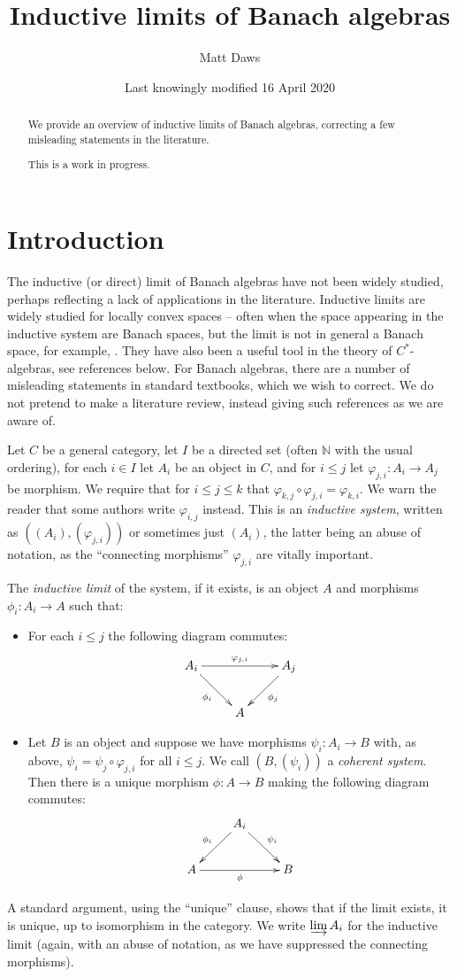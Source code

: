 \documentclass[a4paper,11pt]{article}
\title{Inductive limits of Banach algebras}
\author{Matt Daws}
\date{Last knowingly modified 16 April 2020}
\newcommand{\indlim}{\varinjlim}
\theoremstyle{definition}
\begin{document}
\maketitle

\begin{abstract}
We provide an overview of inductive limits of Banach algebras, correcting a few misleading
statements in the literature.

This is a work in progress.
\end{abstract}

\section{Introduction}

The inductive (or direct) limit of Banach algebras have not been widely studied, perhaps reflecting
a lack of applications in the literature.  Inductive limits are widely studied for locally convex
spaces -- often when the space appearing in the inductive system are Banach spaces, but the limit is
not in general a Banach space, for example, \cite[Chapter~IV, Section~5]{conway}.  They have also
been a useful tool in the theory of $C^*$-algebras, see references below.  For Banach algebras,
there are a number of misleading statements in standard textbooks, which we wish to correct.  We do
not pretend to make a literature review, instead giving such references as we are aware of.

Let $C$ be a general category, let $I$ be a directed set (often $\mathbb N$ with the usual
ordering), for each $i\in I$ let $A_i$ be an object in $C$, and for $i\leq j$ let $\varphi_{j,i}:
A_i\rightarrow A_j$ be morphism.  We require that for $i\leq j\leq k$ that $\varphi_{k,j} \circ
\varphi_{j,i} = \varphi_{k,i}$.  We warn the reader that some authors write $\varphi_{i,j}$
instead.  This is an \emph{inductive system}, written as $((A_i), (\varphi_{j,i}))$ or sometimes
just $(A_i)$, the latter being an abuse of notation, as the ``connecting morphisms'' $\varphi_{j,i}$
are vitally important.

The \emph{inductive limit} of the system, if it exists, is an object $A$ and morphisms $\phi_i:
A_i\rightarrow A$ such that:
\begin{itemize}
\item For each $i\leq j$ the following diagram commutes:
\[ \xymatrix{ A_i \ar[rr]^-{\varphi_{j,i}} \ar[rd]_{\phi_i} && A_j \ar[ld]^{\phi_j} \\
& A
} \]
\item Let $B$ is an object and suppose we have morphisms $\psi_i:A_i\rightarrow B$ with, as above,
$\psi_i = \psi_j \circ \varphi_{j,i}$ for all $i\leq j$.  We call $(B,(\psi_i))$ a \emph{coherent
system}.  Then there is a unique morphism
$\phi:A\rightarrow B$ making the following diagram commutes:
\[ \xymatrix{ & A_i \ar[ld]_{\phi_i} \ar[rd]^{\psi_i} \\
A \ar[rr]_{\phi} && B
} \]
\end{itemize}
A standard argument, using the ``unique'' clause, shows that if the limit exists, it is unique,
up to isomorphism in the category.  We write $\indlim A_i$ for the inductive limit (again, with an
abuse of notation, as we have suppressed the connecting morphisms).
\end{document}

